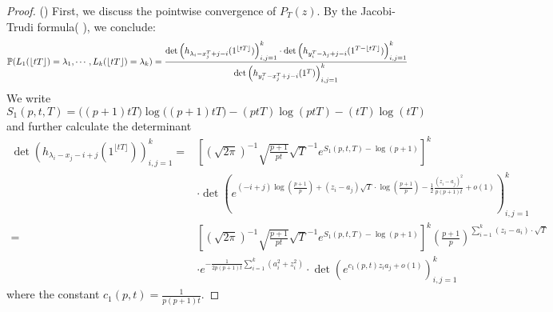 \begin{proof}
	() First, we discuss the pointwise convergence of $P_{T}(z)$. By the Jacobi-Trudi formula(\cite[Chapter 1, (5.4)]{Mac} ), we conclude:
\begin{align}{\label{J-T}}
\mathbb{P}(L_1(\lfloor tT\rfloor)=\lambda_1,\cdots, L_k(\lfloor tT\rfloor)=\lambda_k)=\frac{\det\left(h_{\lambda_i-x_j^T+j-i}(1^{\lfloor tT\rfloor})\right)_{i,j=1}^k\cdot\det\left(h_{y_i^T-\lambda_j+j-i}(1^{T-\lfloor tT\rfloor})\right)_{i,j=1}^k}{\det\left(h_{y_i^{T}-x_j^T+j-i}(1^T)\right)_{i,j=1}^k}	
\end{align}
We write $S_{1}(p,t,T)=\big((p+1)tT)\log((p+1)tT\big)-(ptT)\log(ptT)-(tT)\log(tT)$ and further calculate the determinant 
\begin{align*} 
\det(h_{\lambda_{i}-x_{j}-i+j}(1^{\lfloor tT \rfloor}))_{i,j=1}^{k} =&\left[(\sqrt{2\pi})^{-1}\sqrt{\frac{p+1}{pt}}\sqrt{T}^{-1}e^{S_{1}(p,t,T)-\log(p+1)}\right]^{k}\\
&\cdot
	 \det\left(e^{(-i+j)\log(\frac{p+1}{p})+(z_{i}-a_{j})\sqrt{T}\cdot \log(\frac{p+1}{p})-\frac{1}{2}\frac{(z_{i}-a_{j})^2}{p(p+1)t}+o(1)}\right)_{i,j=1}^{k}\\
	 =& \left[(\sqrt{2\pi})^{-1}\sqrt{\frac{p+1}{pt}}\sqrt{T}^{-1}e^{S_{1}(p,t,T)-\log(p+1)}\right]^{k}\left(\frac{p+1}{p}\right)^{\sum_{i=1}^{k}(z_{i}-a_{i})\cdot\sqrt{T}} \\
	&\cdot e^{-\frac{1}{2p(p+1)t}\sum_{i=1}^{k}(a_{i}^2+z_{i}^2)}\cdot \det\left(e^{c_{1}(p,t)z_{i}a_{j}+o(1)}\right)_{i,j=1}^{k}
\end{align*}
where the constant $c_{1}(p,t)=\frac{1}{p(p+1)t}$.


\end{proof}
